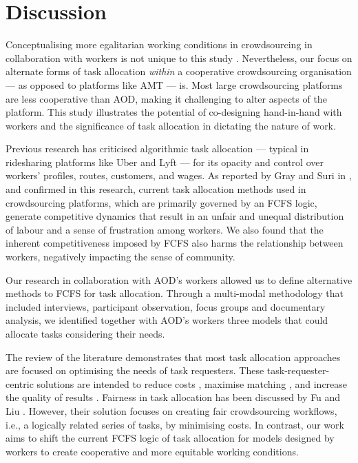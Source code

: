 
\section{Discussion}
\label{sec:discussion}

Conceptualising more egalitarian working conditions in crowdsourcing in collaboration with workers is not unique to this study \cite{kittur2013future,graham2018towards}. Nevertheless, our focus on alternate forms of task allocation \textit{within} a cooperative crowdsourcing organisation — as opposed to platforms like AMT — is. Most large crowdsourcing platforms are less cooperative than AOD, making it challenging to alter aspects of the platform. This study illustrates the potential of co-designing hand-in-hand with workers and the significance of task allocation in dictating the nature of work. %

Previous research has criticised algorithmic task allocation — typical in ridesharing platforms like Uber and Lyft — for its opacity and control over workers' profiles, routes, customers, and wages. As reported by Gray and Suri in \cite{gray2019ghost}, and confirmed in this research, current task allocation methods used in crowdsourcing platforms, which are primarily governed by an FCFS logic, generate competitive dynamics that result in an unfair and unequal distribution of labour and a sense of frustration among workers. We also found that the inherent competitiveness imposed by FCFS also harms the relationship between workers, negatively impacting the sense of community.

Our research in collaboration with AOD's workers allowed us to define alternative methods to FCFS for task allocation. Through a multi-modal methodology that included interviews, participant observation, focus groups and documentary analysis, we identified together with AOD's workers three models that could allocate tasks considering their needs.

The review of the literature demonstrates that most task allocation approaches are focused on optimising the needs of task requesters. These task-requester-centric solutions are intended to reduce costs \cite{ho2012online}, maximise matching \cite{machado2016task}, and increase the quality of results \cite{yu2013bringing}. Fairness in task allocation has been discussed by Fu and Liu \cite{fu2021fairness}. However, their solution focuses on creating fair crowdsourcing workflows, i.e., a logically related series of tasks, by minimising costs. In contrast, our work aims to shift the current FCFS logic of task allocation for models designed by workers to create cooperative and more equitable working conditions.

